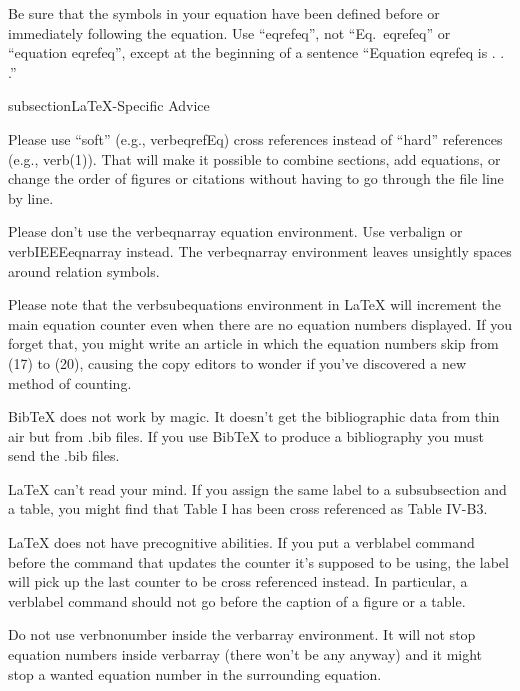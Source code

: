 Be sure that the 
symbols in your equation have been defined before or immediately following 
the equation. Use ``eqref{eq}'', not ``Eq.~eqref{eq}'' or ``equation eqref{eq}'', except at 
the beginning of a sentence ``Equation eqref{eq} is . . .''

subsection{LaTeX-Specific Advice}

Please use ``soft'' (e.g., verbeqref{Eq}) cross references instead
of ``hard'' references (e.g., verb(1)). That will make it possible
to combine sections, add equations, or change the order of figures or
citations without having to go through the file line by line.

Please don't use the verb{eqnarray} equation environment. Use
verb{align} or verb{IEEEeqnarray} instead. The verb{eqnarray}
environment leaves unsightly spaces around relation symbols.

Please note that the verb{subequations} environment in {LaTeX}
will increment the main equation counter even when there are no
equation numbers displayed. If you forget that, you might write an
article in which the equation numbers skip from (17) to (20), causing
the copy editors to wonder if you've discovered a new method of
counting.

{BibTeX} does not work by magic. It doesn't get the bibliographic
data from thin air but from .bib files. If you use {BibTeX} to produce a
bibliography you must send the .bib files. 

{LaTeX} can't read your mind. If you assign the same label to a
subsubsection and a table, you might find that Table I has been cross
referenced as Table IV-B3. 

{LaTeX} does not have precognitive abilities. If you put a
verblabel command before the command that updates the counter it's
supposed to be using, the label will pick up the last counter to be
cross referenced instead. In particular, a verblabel command
should not go before the caption of a figure or a table.

Do not use verbnonumber inside the verb{array} environment. It
will not stop equation numbers inside verb{array} (there won't be
any anyway) and it might stop a wanted equation number in the
surrounding equation.

